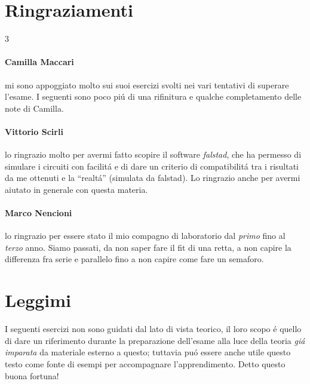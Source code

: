 \section*{Ringraziamenti}
\begin{multicols}{3}
  \paragraph{Camilla Maccari} mi sono appoggiato molto sui
  suoi esercizi svolti nei vari tentativi di superare l'esame. I
  seguenti sono poco pi\'u di una rifinitura e qualche completamento
  delle note di Camilla.

  \paragraph{Vittorio Scirli} lo ringrazio molto per avermi fatto scopire
  il software \textit{falstad}, che ha permesso di simulare i circuiti con
  facilit\'a e di dare un criterio di compatibilit\'a tra i risultati
  da me ottenuti e la ``realt\'a'' (simulata da falstad). Lo ringrazio
  anche per avermi aiutato in generale con questa materia.

  \paragraph{Marco Nencioni} lo ringrazio per essere stato il mio
  compagno di laboratorio dal \textit{primo} fino al \textit{terzo}
  anno. Siamo passati, da non saper fare il fit di una retta, a non capire
  la differenza fra serie e parallelo fino a non capire come fare un
  semaforo.
\end{multicols}

\section*{Leggimi}
I seguenti esercizi non sono guidati dal lato di vista teorico, il
loro scopo \'e quello di dare un riferimento durante la preparazione
dell'esame alla luce della teoria \textit{gi\'a imparata} da materiale
esterno a questo; tuttavia pu\'o essere anche utile questo testo come
fonte di esempi per accompagnare l'apprendimento.
Detto questo buona fortuna!
